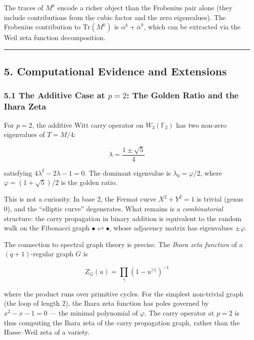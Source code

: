\documentclass[
  11pt,
]{article}
\begin{document}
The traces of \(M^k\) encode a richer object than the Frobenius pair alone (they
include contributions from the cubic factor and the zero eigenvalues). The
Frobenius contribution to \(\mathrm{Tr}(M^k)\) is \(\alpha^k + \bar{\alpha}^k\),
which can be extracted via the Weil zeta function decomposition.

\begin{center}\rule{0.5\linewidth}{0.5pt}\end{center}

\newpage

\subsection{5. Computational Evidence and
Extensions}\label{computational-evidence-and-extensions}

\subsubsection{\texorpdfstring{5.1 The Additive Case at \(p = 2\): The Golden
Ratio and the Ihara
Zeta}{5.1 The Additive Case at p = 2: The Golden Ratio and the Ihara Zeta}}\label{the-additive-case-at-p-2-the-golden-ratio-and-the-ihara-zeta}

For \(p = 2\), the additive Witt carry operator on \(W_3(\mathbb{F}_2)\) has two
non-zero eigenvalues of \(T = M/4\):

\[\lambda = \frac{1 \pm \sqrt{5}}{4}\]

satisfying \(4\lambda^2 - 2\lambda - 1 = 0\). The dominant eigenvalue is
\(\lambda_0 = \varphi/2\), where \(\varphi = (1+\sqrt{5})/2\) is the golden
ratio.

This is not a curiosity. In base 2, the Fermat curve \(X^2 + Y^2 = 1\) is
trivial (genus 0), and the ``elliptic curve'' degenerates. What remains is a
\emph{combinatorial} structure: the carry propagation in binary addition is
equivalent to the random walk on the Fibonacci graph
\(\bullet \rightleftharpoons \bullet\), whose adjacency matrix has eigenvalues
\(\pm \varphi\).

The connection to spectral graph theory is precise. The \emph{Ihara zeta
function} of a \((q+1)\)-regular graph \(G\) is

\[Z_G(u) = \prod_{\gamma} (1 - u^{|\gamma|})^{-1}\]

where the product runs over primitive cycles. For the simplest non-trivial graph
(the loop of length 2), the Ihara zeta function has poles governed by
\(x^2 - x - 1 = 0\) --- the minimal polynomial of \(\varphi\). The carry
operator at \(p = 2\) is thus computing the Ihara zeta of the carry propagation
graph, rather than the Hasse--Weil zeta of a variety.
\end{document}
